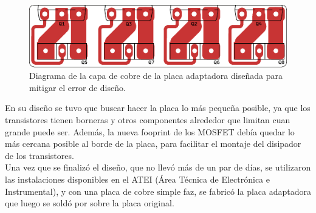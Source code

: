 \begin{figure}[h]
    \centering
    \includegraphics[scale=1.2]{Imagenes/Placa Adaptadora.pdf}
    \caption{Diagrama de la capa de cobre de la placa adaptadora diseñada para mitigar el error de diseño.}
    \label{placa_adaptadora}
\end{figure}

En su diseño se tuvo que buscar hacer la placa lo más pequeña posible, ya que los transistores tienen borneras y otros componentes alrededor que limitan cuan grande puede ser. Además, la nueva fooprint de los MOSFET debía quedar lo más cercana posible al borde de la placa, para facilitar el montaje del disipador de los transistores.\\

Una vez que se finalizó el diseño, que no llevó más de un par de días, se utilizaron las instalaciones disponibles en el ATEI (Área Técnica de Electrónica e Instrumental), y con una placa de cobre simple faz, se fabricó la placa adaptadora que luego se soldó por sobre la placa original.\\